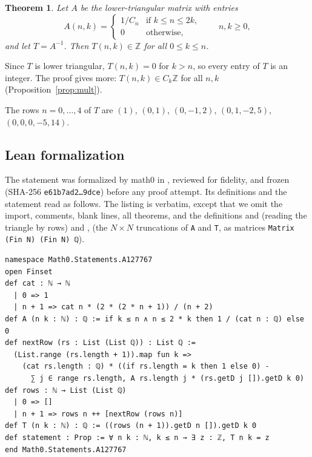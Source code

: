 \documentclass[11pt]{amsart}
\theoremstyle{plain}
\newtheorem{theorem}{Theorem}
\theoremstyle{definition}
\newcommand{\Z}{\mathbb{Z}}
\begin{document}
\begin{theorem}\label{thm:main}
Let $A$ be the lower-triangular matrix with entries
\[
  A(n,k)=\begin{cases}1/C_n & \text{if } k\le n\le 2k,\\ 0 & \text{otherwise,}\end{cases}\qquad n,k\ge0,
\]
and let $T=A^{-1}$. Then $T(n,k)\in\Z$ for all $0\le k\le n$.
\end{theorem}

Since $T$ is lower triangular, $T(n,k)=0$ for $k>n$, so every entry of $T$ is an integer. The proof gives more: $T(n,k)\in C_k\Z$ for all $n,k$ (Proposition~\ref{prop:mult}).

The rows $n=0,\dots,4$ of $T$ are $(1)$, $(0,1)$, $(0,-1,2)$, $(0,1,-2,5)$, $(0,0,0,-5,14)$.

\subsection*{Lean formalization}
The statement was formalized by math0 in , reviewed for fidelity, and frozen (SHA-256 \texttt{e61b7ad2\ldots 9dce}) before any proof attempt. Its definitions and the statement read as follows. The listing is verbatim, except that we omit the import, comments, blank lines, all theorems, and the definitions  and  (reading the triangle by rows) and ,  (the $N\times N$ truncations of \texttt{A} and \texttt{T}, as matrices \texttt{Matrix (Fin N) (Fin N) ℚ}).
\begin{lstlisting}
namespace Math0.Statements.A127767
open Finset
def cat : ℕ → ℕ
  | 0 => 1
  | n + 1 => cat n * (2 * (2 * n + 1)) / (n + 2)
def A (n k : ℕ) : ℚ := if k ≤ n ∧ n ≤ 2 * k then 1 / (cat n : ℚ) else 0
def nextRow (rs : List (List ℚ)) : List ℚ :=
  (List.range (rs.length + 1)).map fun k =>
    (cat rs.length : ℚ) * ((if rs.length = k then 1 else 0) -
      ∑ j ∈ range rs.length, A rs.length j * (rs.getD j []).getD k 0)
def rows : ℕ → List (List ℚ)
  | 0 => []
  | n + 1 => rows n ++ [nextRow (rows n)]
def T (n k : ℕ) : ℚ := ((rows (n + 1)).getD n []).getD k 0
def statement : Prop := ∀ n k : ℕ, k ≤ n → ∃ z : ℤ, T n k = z
end Math0.Statements.A127767
\end{lstlisting}
\end{document}
